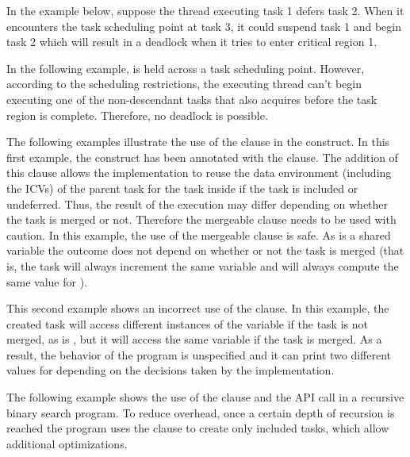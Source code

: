 In the example below, suppose the thread executing task 1 defers task 2.  When 
it encounters the task scheduling point at task 3, it could suspend task 1 and 
begin task 2 which will result in a deadlock when it tries to enter critical region 
1.




In the following example,  is held across a task scheduling point. 
 However, according to the scheduling restrictions, the executing thread can't 
begin executing one of the non-descendant tasks that also acquires  before 
the task region is complete.  Therefore, no deadlock is possible.




The following examples illustrate the use of the  clause in the 
 construct. In this first example, the  construct has 
been annotated with the   clause. The addition of this clause 
allows the implementation to reuse the data environment (including the ICVs) of 
the parent task for the task inside  if the task is included or undeferred. 
Thus, the result of the execution may differ depending on whether the task is merged 
or not. Therefore the mergeable clause needs to be used with caution. In this example, 
the use of the mergeable clause is safe. As  is a shared variable the 
outcome does not depend on whether or not the task is merged (that is, the task 
will always increment the same variable and will always compute the same value 
for ).



This second example shows an incorrect use of the  clause. In 
this example, the created task will access different instances of the variable 
 if the task is not merged, as  is , but 
it will access the same variable  if the task is merged. As a result, 
the behavior of the program is unspecified and it can print two different values 
for  depending on the decisions taken by the implementation.



The following example shows the use of the  clause and the  
API call in a recursive binary search program. To reduce overhead, once a certain 
depth of recursion is reached the program uses the  clause to create 
only included tasks, which allow additional optimizations.

